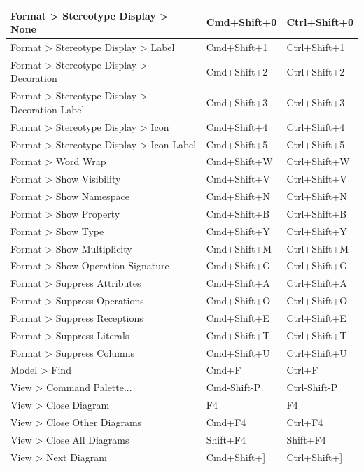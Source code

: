 \documentclass[a4paper,12pt]{report}
\begin{document}
\begin{longtable}{|l|l|l|}
			Format > Stereotype Display > None & Cmd+Shift+0 & Ctrl+Shift+0 \\ \hline
			Format > Stereotype Display > Label & Cmd+Shift+1 & Ctrl+Shift+1 \\ \hline
			Format > Stereotype Display > Decoration & Cmd+Shift+2 & Ctrl+Shift+2 \\ \hline
			Format > Stereotype Display > Decoration Label & Cmd+Shift+3 & Ctrl+Shift+3 \\ \hline
			Format > Stereotype Display > Icon & Cmd+Shift+4 & Ctrl+Shift+4 \\ \hline
			Format > Stereotype Display > Icon Label & Cmd+Shift+5 & Ctrl+Shift+5 \\ \hline
			Format > Word Wrap & Cmd+Shift+W & Ctrl+Shift+W \\ \hline
			Format > Show Visibility & Cmd+Shift+V & Ctrl+Shift+V \\ \hline
			Format > Show Namespace & Cmd+Shift+N & Ctrl+Shift+N \\ \hline
			Format > Show Property & Cmd+Shift+B & Ctrl+Shift+B \\ \hline
			Format > Show Type & Cmd+Shift+Y & Ctrl+Shift+Y \\ \hline
			Format > Show Multiplicity & Cmd+Shift+M & Ctrl+Shift+M \\ \hline
			Format > Show Operation Signature & Cmd+Shift+G & Ctrl+Shift+G \\ \hline
			Format > Suppress Attributes & Cmd+Shift+A & Ctrl+Shift+A \\ \hline
			Format > Suppress Operations & Cmd+Shift+O & Ctrl+Shift+O \\ \hline
			Format > Suppress Receptions & Cmd+Shift+E & Ctrl+Shift+E \\ \hline
			Format > Suppress Literals & Cmd+Shift+T & Ctrl+Shift+T \\ \hline
			Format > Suppress Columns & Cmd+Shift+U & Ctrl+Shift+U \\ \hline
			Model > Find & Cmd+F & Ctrl+F \\ \hline
			View > Command Palette... & Cmd-Shift-P & Ctrl-Shift-P \\ \hline
			View > Close Diagram & F4 & F4 \\ \hline
			View > Close Other Diagrams & Cmd+F4 & Ctrl+F4 \\ \hline
			View > Close All Diagrams & Shift+F4 & Shift+F4 \\ \hline
			View > Next Diagram & Cmd+Shift+] & Ctrl+Shift+] \\ \hline

\end{longtable}
\end{document}
